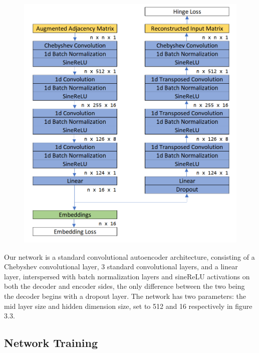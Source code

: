 \documentclass[12pt,twoside]{report}
\begin{document}
\begin{figure}[H]
\begin{center}

\includegraphics[width=\linewidth]{diagram/please.PNG}

\end{center}
\end{figure}

Our network is a standard convolutional autoencoder architecture, consisting of a Chebyshev convolutional layer, 3 standard convolutional layers, and a linear layer, interspersed with batch normalization layers and sineReLU activations on both the decoder and encoder sides, the only difference between the two being the decoder begins with a dropout layer. The network has two parameters: the mid layer size and hidden dimension size, set to 512 and 16 respectively in figure 3.3. \\

\subsection{Network Training}
\end{document}

